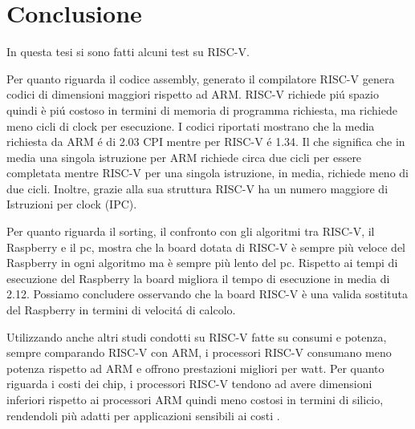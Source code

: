 \documentclass[12pt, a4paper]{report}
\begin{document}

\chapter{Conclusione}

In questa tesi si sono fatti alcuni test su RISC-V. 


Per quanto riguarda il codice assembly, generato il compilatore RISC-V genera codici di dimensioni maggiori rispetto ad ARM. RISC-V richiede pi\'u spazio quindi è pi\'u costoso in termini di memoria di programma richiesta, ma richiede meno cicli di clock per esecuzione. I codici riportati mostrano che la media richiesta da ARM \'e di 2.03 CPI mentre per RISC-V \'e 1.34. Il che significa che in media una singola istruzione per ARM richiede circa due cicli per essere completata mentre RISC-V per una singola istruzione, in media, richiede meno di due cicli. Inoltre, grazie alla sua struttura RISC-V ha un numero maggiore di Istruzioni per clock (IPC). 

Per quanto riguarda il sorting, il confronto con gli algoritmi tra RISC-V, il Raspberry e il pc, mostra che la board dotata di RISC-V è sempre più veloce del Raspberry in ogni algoritmo ma è sempre più lento del pc. Rispetto ai tempi di esecuzione del Raspberry la board
migliora il tempo di esecuzione in media di 2.12. 
Possiamo concludere osservando che la board RISC-V è una valida sostituta del Raspberry in termini di velocit\'a di calcolo.%

Utilizzando anche altri studi condotti su RISC-V fatte su consumi e potenza,
sempre comparando RISC-V con ARM, i processori RISC-V consumano meno potenza rispetto ad ARM e offrono prestazioni migliori per watt.  Per quanto riguarda i costi dei chip, i processori RISC-V tendono ad avere dimensioni inferiori rispetto ai processori ARM quindi meno costosi in termini di silicio, rendendoli più adatti per applicazioni sensibili ai costi \cite{blogArmRISC-V}.
\end{document}

